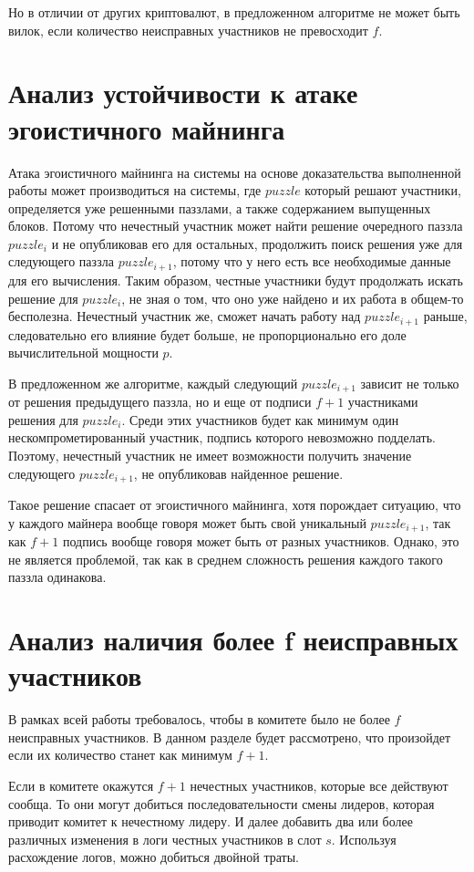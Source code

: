 Но в отличии от других криптовалют, в предложенном алгоритме не может быть вилок, если количество неисправных участников не превосходит $f$.

\section{Анализ устойчивости к атаке эгоистичного майнинга}
Атака эгоистичного майнинга на системы на основе доказательства выполненной работы может производиться на системы, где $puzzle$ который решают участники, определяется уже решенными паззлами, а также содержанием выпущенных блоков. Потому что нечестный участник может найти решение очередного паззла $puzzle_i$ и не опубликовав его для остальных, продолжить поиск решения уже для следующего паззла $puzzle_{i+1}$, потому что у него есть все необходимые данные для его вычисления. Таким образом, честные участники будут продолжать искать решение для $puzzle_i$, не зная о том, что оно уже найдено и их работа в общем-то бесполезна. Нечестный участник же, сможет начать работу над $puzzle_{i+1}$ раньше, следовательно его влияние будет больше, не пропорционально его доле вычислительной мощности $p$.

В предложенном же алгоритме, каждый следующий $puzzle_{i+1}$ зависит не только от решения предыдущего паззла, но и еще от подписи $f+1$ участниками решения для $puzzle_i$. Среди этих участников будет как минимум один нескомпрометированный  участник, подпись которого невозможно подделать. Поэтому, нечестный участник не имеет возможности получить значение следующего $puzzle_{i+1}$, не опубликовав найденное решение.

Такое решение спасает от эгоистичного майнинга, хотя порождает ситуацию, что у каждого майнера вообще говоря может быть свой уникальный $puzzle_{i+1}$, так как $f+1$ подпись вообще говоря может быть от разных участников. Однако, это не является проблемой, так как в среднем сложность решения каждого такого паззла одинакова.
 
\section{Анализ наличия более f неисправных участников}
В рамках всей работы требовалось, чтобы в комитете было не более $f$ неисправных участников.
В данном разделе будет рассмотрено, что произойдет если их количество станет как минимум $f+1$.

Если в комитете окажутся $f+1$ нечестных участников, которые все действуют сообща. То они могут добиться последовательности смены лидеров, которая приводит комитет к нечестному лидеру. И далее добавить два или более различных изменения в логи честных участников в слот $s$. Используя расхождение логов, можно добиться двойной траты.

